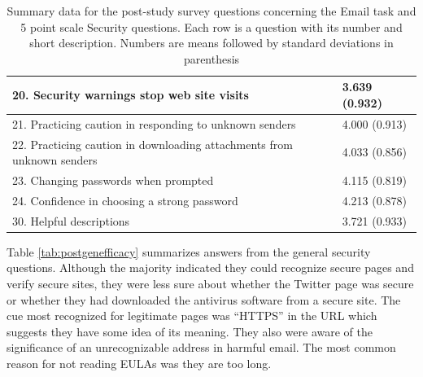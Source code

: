 \begin{table}[tpb]
\caption{Summary data for the post-study survey questions concerning the Email task and 5 point
scale Security questions. Each row is a question with its number and short description. Numbers
are means followed by standard deviations in parenthesis}
\label{tab:postemailefficacy}
\begin{tabular}{|ll|}
\hline
20. Security warnings stop web site visits   & 3.639 (0.932) \\ \hline
21. Practicing caution in responding to unknown senders                & 4.000 (0.913) \\ \hline
22. Practicing caution in downloading attachments from unknown senders & 4.033 (0.856) \\ \hline
23. Changing passwords when prompted         & 4.115 (0.819) \\ \hline
24. Confidence in choosing a strong password & 4.213 (0.878) \\ \hline
30. Helpful descriptions                     & 3.721 (0.933) \\ \hline
\end{tabular}
\end{table}

Table \ref{tab:postgenefficacy}
 summarizes answers from the general security questions. Although the majority indicated they could recognize secure pages and verify secure sites, they were less sure about whether the Twitter page was secure or whether they had downloaded the antivirus software from a secure site. The cue most recognized for legitimate pages was ``HTTPS'' in the URL which suggests they have some idea of its meaning. They also were aware of the significance of an unrecognizable address in harmful email. The most common reason for not reading EULAs was they are too long.

